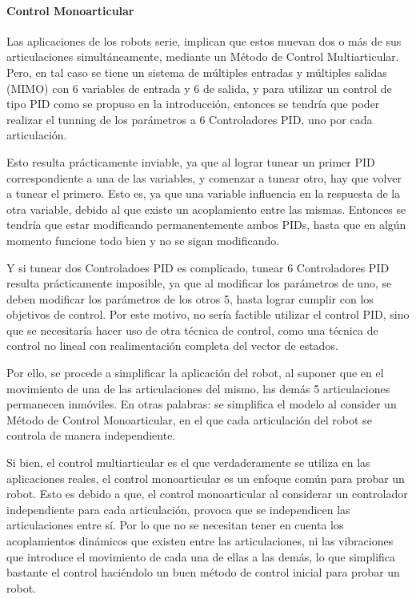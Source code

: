 \documentclass{article}
\begin{document}
\begin{sloppypar}
\paragraph{Control Monoarticular}
\label{sec:Control Monoarticular}
\hfill

Las aplicaciones de los robots serie, implican que estos muevan dos o más de sus articulaciones simultáneamente, mediante un Método de Control Multiarticular. Pero, en tal caso se tiene un sistema de múltiples entradas y múltiples salidas (MIMO) con 6 variables de entrada y 6 de salida, y para utilizar un control de tipo PID como se propuso en la introducción, entonces se tendría que poder realizar el tunning de los parámetros a 6 Controladores PID, uno por cada articulación.

Esto resulta prácticamente inviable, ya que al lograr tunear un primer PID correspondiente a una de las variables, y comenzar a tunear otro, hay que volver a tunear el primero. Esto es, ya que una variable influencia en la respuesta de la otra variable, debido al que existe un acoplamiento entre las mismas. Entonces se tendría que estar modificando permanentemente ambos PIDs, hasta que en algún momento funcione todo bien y no se sigan modificando.

Y si tunear dos Controladoes PID es complicado, tunear 6 Controladores PID resulta prácticamente imposible, ya que al modificar los parámetros de uno, se deben modificar los parámetros de los otros 5, hasta lograr cumplir con los objetivos de control.
Por este motivo, no sería factible utilizar el control PID, sino que se necesitaría hacer uso de otra técnica de control, como una técnica de control no lineal con realimentación completa del vector de estados.

Por ello, se procede a simplificar la aplicación del robot, al suponer que en el movimiento de una de las articulaciones del mismo, las demás 5 articulaciones permanecen inmóviles. En otras palabras: se simplifica el modelo al consider un Método de Control Monoarticular, en el que cada articulación del robot se controla de manera independiente.

Si bien, el control multiarticular es el que verdaderamente se utiliza en las aplicaciones reales, el control monoarticular es un enfoque común para probar un robot. Esto es debido a que, el control monoarticular al considerar un controlador independiente para cada articulación, provoca que se independicen las articulaciones entre sí. Por lo que no se necesitan tener en cuenta los acoplamientos dinámicos que existen entre las articulaciones, ni las vibraciones que introduce el movimiento de cada una de ellas a las demás, lo que simplifica bastante el control haciéndolo un buen método de control inicial para probar un robot.


\end{sloppypar}
\end{document}

